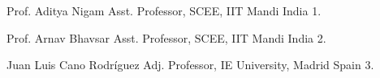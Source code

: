 


\begin{cvhonors}


\cvhonor
{Prof. Aditya Nigam} %
{Asst. Professor, SCEE, IIT Mandi} %
{India} %
{1.} %

\cvhonor
{Prof. Arnav Bhavsar} %
{Asst. Professor, SCEE, IIT Mandi} %
{India} %
{2.} %


\cvhonor
{Juan Luis Cano Rodríguez} %
{Adj. Professor, IE University, Madrid} %
{Spain} %
{3.} %



\end{cvhonors}